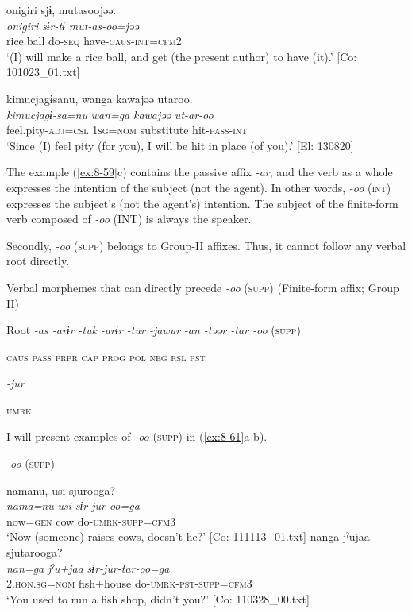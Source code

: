 \ex
{\TM}
\glll  {\textbar}onigiri{\textbar}  sjɨ,  mutasoojəə.\\
\textit{onigiri}  \textit{sɨr-tɨ}  \textit{mut-as-oo=jəə}\\
rice.ball  do-\textsc{seq}  have-\textsc{caus}-\textsc{int}=\textsc{cfm2}\\
\glt ‘(I) will make a rice ball, and get (the present author) to have (it).’ [Co: 101023\_01.txt]

\ex
{\TM}
\glll  kimucjagɨsanu,  wanga  kawajəə  utaroo.\\
\textit{kimucjagɨ-sa=nu}  \textit{wan=ga}  \textit{kawajəə}  \textit{ut-ar-oo}\\
feel.pity-\textsc{adj}=\textsc{csl}  1\textsc{sg}=\textsc{nom}  substitute  hit-\textsc{pass}-\textsc{int}\\
\glt ‘Since (I) feel pity (for you), I will be hit in place (of you).’ [El: 130820]
\z
\z

The example (\ref{ex:8-59}c) contains the passive affix \textit{-ar}, and the verb as a whole expresses the intention of the subject (not the agent). In other words, \textit{-oo} (\textsc{int}) expresses the subject’s (not the agent’s) intention. The subject of the finite-form verb composed of \textit{-oo} (INT) is always the speaker.

  Secondly, \textit{-oo} (\textsc{supp}) belongs to Group-II affixes. Thus, it cannot follow any verbal root directly.

\ea\label{ex:8-60}
  Verbal morphemes that can directly precede \textit{-oo} (\textsc{supp}) (Finite-form affix; Group II)

  Root  \textit{-as  -arɨr} %
\textit{-tuk  -arɨr  -tur  -jawur} %
\textit{-an  -təər  -tar  -oo} (\textsc{supp})

    \textsc{caus}  \textsc{pass}  \textsc{prpr}  \textsc{cap}  \textsc{prog}  \textsc{pol}  \textsc{neg}  \textsc{rsl}  \textsc{pst}

          \textit{-jur}

          \textsc{umrk}
\z

I will present examples of \textit{-oo} (\textsc{supp}) in (\ref{ex:8-61}a-b).

\ea\label{ex:8-61}
  \textit{-oo} (\textsc{supp})

\ea
{\TM}
\glll  namanu,  usi  sjurooga?\\
\textit{nama=nu}  \textit{usi}  \textit{sɨr-jur-oo=ga}\\
now=\textsc{gen}  cow  do-\textsc{umrk}-\textsc{supp}=\textsc{cfm3}\\
\glt ‘Now (someone) raises cows, doesn’t he?’ [Co: 111113\_01.txt]
\ex
{\TM}
\glll  nanga  jˀujaa  sjutarooga?\\
\textit{nan=ga}  \textit{jˀu+jaa}  \textit{sɨr-jur-tar-oo=ga}\\
2.\textsc{hon}.\textsc{sg}=\textsc{nom}  fish+house  do-\textsc{umrk}-\textsc{pst}-\textsc{supp}=\textsc{cfm3}\\
\glt ‘You used to run a fish shop, didn’t you?’ [Co: 110328\_00.txt]
\z
\z


